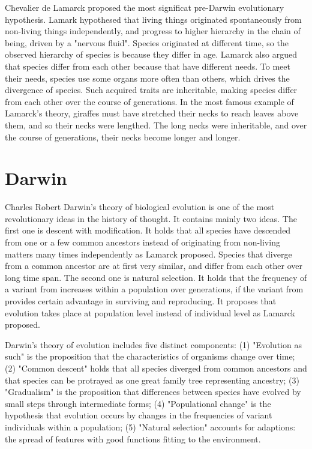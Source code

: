 \documentclass[11pt]{article}
\begin{document}
\begin{sloppypar}
\par

Chevalier de Lamarck proposed the most significat pre-Darwin evolutionary hypothesis. 
Lamark hypothesed that living things originated spontaneously from non-living things independently, and progress to higher hierarchy in the chain of being, driven by a "nervous fluid". 
Species originated at different time, so the observed hierarchy of species is because they differ in age. 
Lamarck also argued that species differ from each other because that have different needs. 
To meet their needs, species use some organs more often than others, which drives the divergence of species. 
Such acquired traits are inheritable, making species differ from each other over the course of generations. 
In the most famous example of Lamarck's theory, giraffes must have stretched their necks to reach leaves above them, and so their necks were lengthed. 
The long necks were inheritable, and over the course of generations, their necks become longer and longer. 

\section{Darwin}
Charles Robert Darwin's theory of biological evolution is one of the most revolutionary ideas in the history of thought. 
It contains mainly two ideas. 
The first one is descent with modification. 
It holds that all species have descended from one or a few common ancestors instead of originating from non-living matters many times independently as Lamarck proposed. 
Species that diverge from a common ancestor are at first very similar, and differ from each other over long time span. 
The second one is natural selection. 
It holds that the frequency of a variant from increases within a population over generations, if the variant from provides certain advantage in surviving and reproducing. 
It proposes that evolution takes place at population level instead of individual level as Lamarck proposed. 

\par

Darwin's theory of evolution includes five distinct components: 
(1) "Evolution as such" is the proposition that the characteristics of organisms change over time; 
(2) "Common descent" holds that all species diverged from common ancestors and that species can be protrayed as one great family tree representing ancestry; 
(3) "Gradualism" is the proposition that differences between species have evolved by small steps through intermediate forms; 
(4) "Populational change" is the hypothesis that evolution occurs by changes in the frequencies of variant individuals within a population; 
(5) "Natural selection" accounts for adaptions: the spread of features with good functions fitting to the environment. 


\end{sloppypar}
\end{document}
